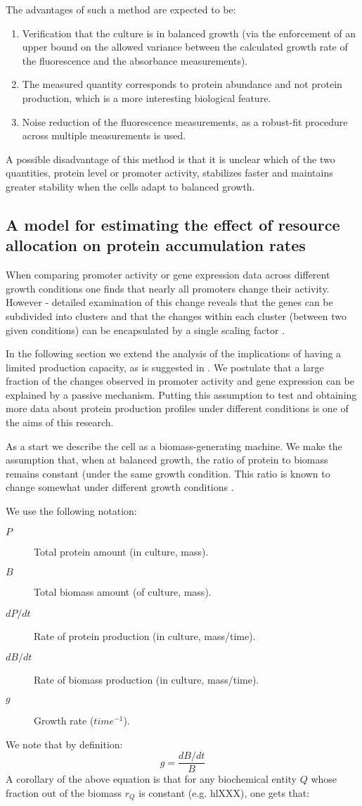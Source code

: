 \documentclass{report}
\begin{document}
The advantages of such a method are expected to be:
\begin{enumerate}
\item Verification that the culture is in balanced growth (via the enforcement of an upper bound on the allowed variance between the calculated growth rate of the fluorescence and the absorbance measurements).
\item The measured quantity corresponds to protein abundance and not protein production, which is a more interesting biological feature.
\item Noise reduction of the fluorescence measurements, as a robust-fit procedure across multiple measurements is used.
\end{enumerate}
A possible disadvantage of this method is that it is unclear which of the two quantities, protein level or promoter activity, stabilizes faster and maintains greater stability when the cells adapt to balanced growth.
\subsection{A model for estimating the effect of resource allocation on protein accumulation rates}
When comparing promoter activity or gene expression data across different growth conditions one finds that nearly all promoters change their activity.
However - detailed examination of this change reveals that the genes can be subdivided into clusters and that the changes within each cluster (between two given conditions) can be encapsulated by a single scaling factor \cite{Leeat2013}.

In the following section we extend the analysis of the implications of having a limited production capacity, as is suggested in \cite{Leeat2013}.
We postulate that a large fraction of the changes observed in promoter activity and gene expression can be explained by a passive mechanism.
Putting this assumption to test and obtaining more data about protein production profiles under different conditions is one of the aims of this research.

As a start we describe the cell as a biomass-generating machine.
We make the assumption that, when at balanced growth, the ratio of protein to biomass remains constant (under the same growth condition.
This ratio is known to change somewhat under different growth conditions \cite{Bremer1987}.

We use the following notation:
\begin{description}
\item[$P$] Total protein amount (in culture, mass).
\item[$B$] Total biomass amount (of culture, mass).
\item [$dP/dt$] Rate of protein production (in culture, mass/time).
\item [$dB/dt$] Rate of biomass production (in culture, mass/time).
\item [$g$] Growth rate ($time^{-1}$).
\end{description}
We note that by definition:
\[ g=\frac{dB/dt}{B}\]
A corollary of the above equation is that for any biochemical entity $Q$ whose fraction out of the biomass $r_Q$ is constant (e.g. hl{XXX}), one gets that:
\end{document}
